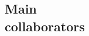 \documentclass[a4paper,margin,line,useAMS,usenatbib]{resume}
\begin{document}
\begin{resume}
%




\section{\mysidestyle Main\\collaborators}


\end{resume}
\end{document}
